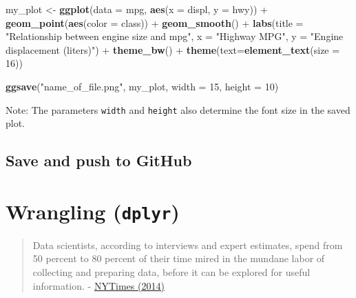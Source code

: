 \documentclass[]{book}
\newenvironment{Shaded}{\begin{snugshade}}{\end{snugshade}}
\newcommand{\KeywordTok}[1]{\textcolor[rgb]{0.13,0.29,0.53}{\textbf{{#1}}}}
\newcommand{\DataTypeTok}[1]{\textcolor[rgb]{0.13,0.29,0.53}{{#1}}}
\newcommand{\DecValTok}[1]{\textcolor[rgb]{0.00,0.00,0.81}{{#1}}}
\newcommand{\StringTok}[1]{\textcolor[rgb]{0.31,0.60,0.02}{{#1}}}
\newcommand{\NormalTok}[1]{{#1}}
\theoremstyle{definition}
\theoremstyle{definition}
\theoremstyle{definition}
\theoremstyle{remark}
\begin{document}
\begin{Shaded}
\begin{Highlighting}[]
\NormalTok{my_plot <-}\StringTok{ }\KeywordTok{ggplot}\NormalTok{(}\DataTypeTok{data =} \NormalTok{mpg, }\KeywordTok{aes}\NormalTok{(}\DataTypeTok{x =} \NormalTok{displ, }\DataTypeTok{y =} \NormalTok{hwy)) +}\StringTok{ }
\StringTok{  }\KeywordTok{geom_point}\NormalTok{(}\KeywordTok{aes}\NormalTok{(}\DataTypeTok{color =} \NormalTok{class)) +}\StringTok{ }
\StringTok{  }\KeywordTok{geom_smooth}\NormalTok{() +}
\StringTok{  }\KeywordTok{labs}\NormalTok{(}\DataTypeTok{title =} \StringTok{"Relationship between engine size and mpg"}\NormalTok{,}
       \DataTypeTok{x =} \StringTok{"Highway MPG"}\NormalTok{,}
       \DataTypeTok{y =} \StringTok{"Engine displacement (liters)"}\NormalTok{) +}
\StringTok{  }\KeywordTok{theme_bw}\NormalTok{() +}
\StringTok{  }\KeywordTok{theme}\NormalTok{(}\DataTypeTok{text=}\KeywordTok{element_text}\NormalTok{(}\DataTypeTok{size =} \DecValTok{16}\NormalTok{))}

\KeywordTok{ggsave}\NormalTok{(}\StringTok{"name_of_file.png"}\NormalTok{, my_plot, }\DataTypeTok{width =} \DecValTok{15}\NormalTok{, }\DataTypeTok{height =} \DecValTok{10}\NormalTok{)}
\end{Highlighting}
\end{Shaded}

Note: The parameters \texttt{width} and \texttt{height} also determine
the font size in the saved plot.

\section{Save and push to GitHub}\label{save-and-push-to-github}

\hypertarget{dplyr}{\chapter{\texorpdfstring{Wrangling
(\texttt{dplyr})}{Wrangling (dplyr)}}\label{dplyr}}

\begin{quote}
Data scientists, according to interviews and expert estimates, spend
from 50 percent to 80 percent of their time mired in the mundane labor
of collecting and preparing data, before it can be explored for useful
information. -
\href{http://www.nytimes.com/2014/08/18/technology/for-big-data-scientists-hurdle-to-insights-is-janitor-work.html}{NYTimes
(2014)}
\end{quote}
\end{document}
